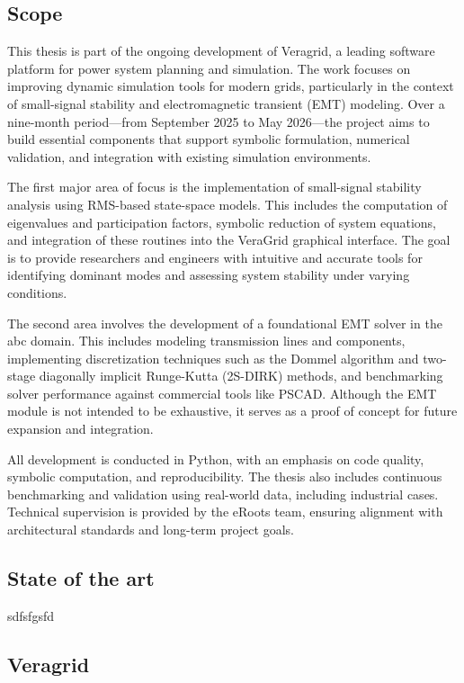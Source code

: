 \subsection{Scope}

This thesis is part of the ongoing development of Veragrid, a leading software platform for power system planning and simulation. 
The work focuses on improving dynamic simulation tools for modern grids, particularly in the context of small-signal stability and electromagnetic transient (EMT) modeling.
Over a nine-month period—from September 2025 to May 2026—the project aims to build essential components that support symbolic formulation, numerical validation,
 and integration with existing simulation environments. 

The first major area of focus is the implementation of small-signal stability analysis using RMS-based state-space models.
This includes the computation of eigenvalues and participation factors, symbolic reduction of system equations,
 and integration of these routines into the VeraGrid graphical interface.
  The goal is to provide researchers and engineers with intuitive and accurate tools for identifying dominant modes and assessing system stability under varying conditions.

The second area involves the development of a foundational EMT solver in the abc domain. This includes modeling transmission lines and components,
 implementing discretization techniques such as the Dommel algorithm and two-stage diagonally implicit Runge-Kutta (2S-DIRK) methods,
  and benchmarking solver performance against commercial tools like PSCAD. Although the EMT module is not intended to be exhaustive,
   it serves as a proof of concept for future expansion and integration.

All development is conducted in Python, with an emphasis on code quality, symbolic computation, and reproducibility.
 The thesis also includes continuous benchmarking and validation using real-world data, including industrial cases.
  Technical supervision is provided by the eRoots team, ensuring alignment with architectural standards and long-term project goals.

\subsection{State of the art}

sdfsfgsfd

\subsection{Veragrid}


